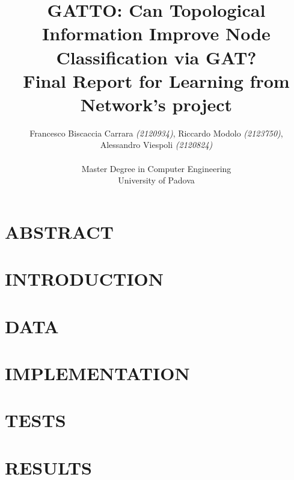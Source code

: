 \documentclass[12pt,conference]{ieeeconf} %
\title{GATTO: Can Topological Information Improve Node Classification via GAT?\\
\large Final Report for Learning from Network's project \\}
\author{Francesco Biscaccia Carrara \textit{(2120934)}, Riccardo Modolo \textit{(2123750)},\\ Alessandro Viespoli \textit{(2120824)} %
\\\\ Master Degree in Computer Engineering \\
University of Padova \\
}
\begin{document}
\maketitle
\thispagestyle{plain}
\pagestyle{plain}

\section{ABSTRACT} 

\section{INTRODUCTION} 

\section{DATA} 

\section{IMPLEMENTATION} 

\section{TESTS} 

\section{RESULTS} 

\vspace{\fill}
\printbibliography

\end{document}
